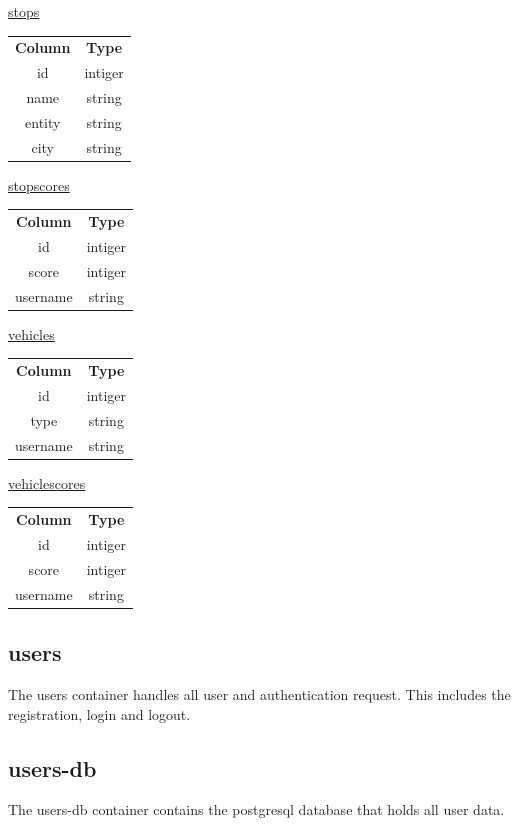 \documentclass[12pt,a4paper]{article}
\begin{document}
\begin{multicols}{2}
\underline{stops}\\
\begin{tabular}{c|c}
\textbf{Column} & \textbf{Type}\\
id & intiger\\\hline
name & string\\\hline
entity & string\\\hline
city & string
\end{tabular}


\underline{stopscores}\\
\begin{tabular}{c|c}
\textbf{Column} & \textbf{Type}\\
id & intiger\\\hline
score & intiger\\\hline
username & string
\end{tabular}

\underline{vehicles}\\
\begin{tabular}{c|c}
\textbf{Column} & \textbf{Type}\\
id & intiger\\\hline
type & string\\\hline
username & string
\end{tabular}

\underline{vehiclescores}\\
\begin{tabular}{c|c}
\textbf{Column} & \textbf{Type}\\
id & intiger\\\hline
score & intiger\\\hline
username & string
\end{tabular}
\end{multicols}

\subsection{users}
The users container handles all user and authentication request. This includes the registration, login and logout.

\pagebreak
\subsection{users-db}
The users-db container contains the postgresql database that holds all user data.\\
\end{document}
